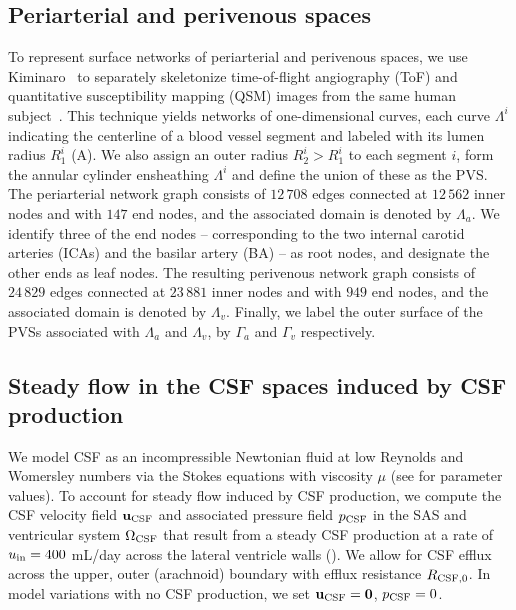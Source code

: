 \documentclass[fleqn,10pt]{wlscirep}
\begin{document}
\subsection*{Periarterial and perivenous spaces}

To represent surface networks of periarterial and perivenous spaces,
we use Kiminaro~\cite{william_silversmith_2021_5539913} to separately
skeletonize time-of-flight angiography (ToF) and quantitative
susceptibility mapping (QSM) images from the same human
subject~\cite{hodneland2019new}. This technique yields networks of
one-dimensional curves, each curve $\Lambda^i$ indicating the
centerline of a blood vessel segment and labeled with its lumen radius
$R_1^i$ (A). We also assign an
outer radius $R_2^i > R_1^i$ to each segment $i$, form the annular
cylinder ensheathing $\Lambda^i$ and define the union of these as the
PVS. The periarterial network graph consists of $12\,708$ edges
connected at $12\,562$ inner nodes and with $147$ end nodes, and the
associated domain is denoted by $\Lambda_a$. We identify three of the
end nodes -- corresponding to the two internal carotid arteries (ICAs)
and the basilar artery (BA) -- as root nodes, and designate the other
ends as leaf nodes. The resulting perivenous network graph consists of
$24\,829$ edges connected at $23\,881$ inner nodes and with $949$ end nodes, and the associated domain is denoted by $\Lambda_v$. Finally, we label the outer surface of the PVSs associated with $\Lambda_a$ and $\Lambda_v$, by $\Gamma_a$ and $\Gamma_v$ respectively.

\subsection*{Steady flow in the CSF spaces induced by CSF production}

We model CSF as an incompressible Newtonian fluid at low Reynolds and
Womersley numbers via the Stokes equations with viscosity $\mu$ (see
 for parameter values). To account for steady
flow induced by CSF production, we compute the CSF velocity field $\mathbf{u}_{\rm CSF}$ and associated pressure field $p_{\rm CSF}$ in the SAS
and ventricular system $\Omega_{\rm CSF}$ that result from a steady
CSF production at a rate of $u_{\rm in} = 400$ mL/day across the
lateral ventricle walls (). We allow for CSF efflux
across the upper, outer (arachnoid) boundary with efflux resistance
$R_{\rm CSF, 0}$. In model variations with no CSF production, we set
$\mathbf{u}_{\rm CSF} = \mathbf{0}$, $p_{\rm CSF} = 0$.
\end{document}
